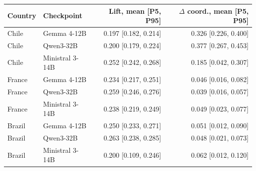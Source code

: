 \begin{tabular}{llrr}
\toprule
Country & Checkpoint & Lift, mean [P5, P95] & $\Delta$ coord., mean [P5, P95] \\
\midrule
Chile & Gemma 4-12B & 0.197 [0.182, 0.214] & 0.326 [0.226, 0.400] \\
Chile & Qwen3-32B & 0.200 [0.179, 0.224] & 0.377 [0.267, 0.453] \\
Chile & Ministral 3-14B & 0.252 [0.242, 0.268] & 0.185 [0.042, 0.307] \\
France & Gemma 4-12B & 0.234 [0.217, 0.251] & 0.046 [0.016, 0.082] \\
France & Qwen3-32B & 0.259 [0.246, 0.276] & 0.039 [0.016, 0.057] \\
France & Ministral 3-14B & 0.238 [0.219, 0.249] & 0.049 [0.023, 0.077] \\
Brazil & Gemma 4-12B & 0.250 [0.233, 0.271] & 0.051 [0.012, 0.090] \\
Brazil & Qwen3-32B & 0.263 [0.238, 0.285] & 0.048 [0.021, 0.073] \\
Brazil & Ministral 3-14B & 0.200 [0.109, 0.246] & 0.062 [0.012, 0.120] \\
\bottomrule
\end{tabular}
